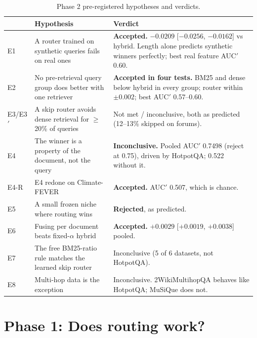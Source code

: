 \documentclass[10pt,twocolumn]{article}
\newcommand{\ci}[2]{[$#1$, $#2$]}
\begin{document}
\begin{table}[t]
\centering
\caption{Phase 2 pre-registered hypotheses and verdicts.}
\label{tab:p2}
\begin{tabularx}{\textwidth}{@{}l>{\raggedright\arraybackslash}p{}Y@{}}
\toprule
 & Hypothesis & Verdict \\
\midrule
E1 & A router trained on synthetic queries fails on real ones & \textbf{Accepted.} $-0.0209$ \ci{-0.0256}{-0.0162} vs hybrid. Length alone predicts synthetic winners perfectly; best real feature AUC$'$ 0.60. \\
E2 & No pre-retrieval query group does better with one retriever & \textbf{Accepted in four tests.} BM25 and dense below hybrid in every group; router within $\pm 0.002$; best AUC$'$ 0.57--0.60. \\
E3/E3$'$ & A skip router avoids dense retrieval for $\ge$20\% of queries & Not met / inconclusive, both as predicted (12--13\% skipped on forums). \\
E4 & The winner is a property of the document, not the query & \textbf{Inconclusive.} Pooled AUC$'$ 0.7498 (reject at 0.75), driven by HotpotQA; 0.522 without it. \\
E4-R & E4 redone on Climate-FEVER & \textbf{Accepted.} AUC$'$ 0.507, which is chance. \\
E5 & A small frozen niche where routing wins & \textbf{Rejected}, as predicted. \\
E6 & Fusing per document beats fixed-$\alpha$ hybrid & \textbf{Accepted.} $+0.0029$ \ci{+0.0019}{+0.0038} pooled. \\
E7 & The free BM25-ratio rule matches the learned skip router & Inconclusive (5 of 6 datasets, not HotpotQA). \\
E8 & Multi-hop data is the exception & Inconclusive. 2WikiMultihopQA behaves like HotpotQA; MuSiQue does not. \\
\bottomrule
\end{tabularx}
\end{table}

\section{Phase 1: Does routing work?}
\end{document}
